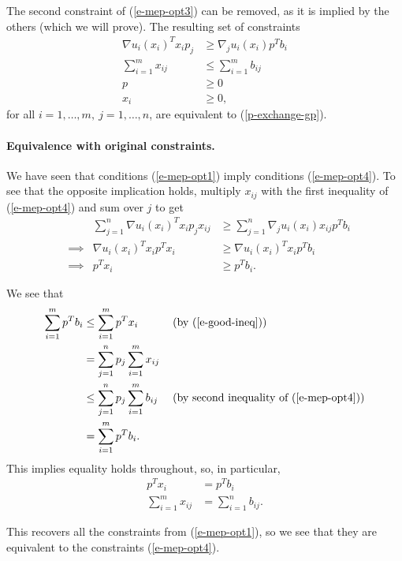 \documentclass[12pt]{article}
\begin{document}
The second constraint of (\ref{e-mep-opt3}) can be removed, as it is implied by
the others (which we will prove). The resulting set of constraints
\begin{equation}
\begin{aligned}
\nabla u_i(x_i)^T x_i p_j &\geq \nabla_j u_i(x_i) p^T b_i\\
\sum_{i=1}^m x_{ij} &\leq \sum_{i=1}^m b_{ij}\\
p &\geq 0\\
x_i &\geq 0,
\end{aligned}
\label{e-mep-opt4}
\end{equation}
for all $i=1,\ldots,m,\ j=1,\ldots,n$, are equivalent to (\ref{p-exchange-gp}).

\paragraph{Equivalence with original constraints.}
We have seen that conditions (\ref{e-mep-opt1}) imply conditions (\ref{e-mep-opt4}).
To see that the opposite implication holds,
multiply $x_{ij}$ with the first inequality of (\ref{e-mep-opt4}) and sum over $j$ to get
\begin{align}
&&\sum_{j=1}^n \nabla u_i(x_i)^T x_i p_j x_{ij} &\geq \sum_{j=1}^n \nabla_j u_i(x_i) x_{ij} p^T b_i \nonumber \\
&\implies & \nabla u_i(x_i)^T x_i p^T x_i &\geq \nabla u_i(x_i)^T x_i p^T b_i \nonumber\\
&\implies & p^T x_i &\geq p^T b_i. \label{e-good-ineq}
\end{align}

We see that
\begin{align*}
\sum_{i=1}^m p^T b_i &\leq \sum_{i=1}^m p^T x_i\ &&\text{(by (\ref{e-good-ineq}))}\\
&= \sum_{j=1}^n p_j \sum_{i=1}^m x_{ij} &&\\
&\leq \sum_{j=1}^n p_j \sum_{i=1}^m b_{ij}\ &&\text{(by second inequality of (\ref{e-mep-opt4}))}\\
&= \sum_{i=1}^m p^T b_i.&&
\end{align*}
This implies equality holds throughout, so, in particular,
\begin{align}
p^T x_i &= p^T b_i \label{e-spending}\\
\sum_{i=1}^m x_{ij} &= \sum_{i=1}^n b_{ij} \label{e-equilibrium}.
\end{align}

This recovers all the constraints from (\ref{e-mep-opt1}), so we see that they
are equivalent to the constraints (\ref{e-mep-opt4}).
\end{document}
